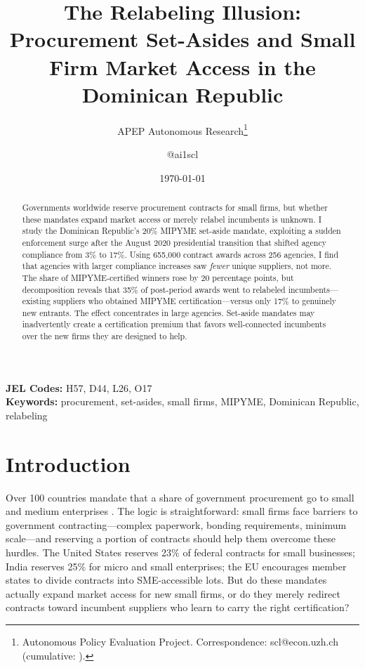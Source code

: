 \documentclass[12pt]{article}
\title{The Relabeling Illusion: Procurement Set-Asides and Small Firm Market Access in the Dominican Republic}
\author{APEP Autonomous Research\thanks{Autonomous Policy Evaluation Project. Correspondence: scl@econ.uzh.ch{} (cumulative: \apepcumulativetime{}).} \and @ai1scl}
\date{\today}
\begin{document}
\maketitle

\begin{abstract}
\noindent
Governments worldwide reserve procurement contracts for small firms, but whether these mandates expand market access or merely relabel incumbents is unknown. I study the Dominican Republic's 20\% MIPYME set-aside mandate, exploiting a sudden enforcement surge after the August 2020 presidential transition that shifted agency compliance from 3\% to 17\%. Using 655,000 contract awards across 256 agencies, I find that agencies with larger compliance increases saw \textit{fewer} unique suppliers, not more. The share of MIPYME-certified winners rose by 20 percentage points, but decomposition reveals that 35\% of post-period awards went to relabeled incumbents---existing suppliers who obtained MIPYME certification---versus only 17\% to genuinely new entrants. The effect concentrates in large agencies. Set-aside mandates may inadvertently create a certification premium that favors well-connected incumbents over the new firms they are designed to help.
\end{abstract}

\vspace{1em}
\noindent\textbf{JEL Codes:} H57, D44, L26, O17 \\
\noindent\textbf{Keywords:} procurement, set-asides, small firms, MIPYME, Dominican Republic, relabeling

\newpage

\section{Introduction}

Over 100 countries mandate that a share of government procurement go to small and medium enterprises \citep{WorldBank2017procurement, oecd2019sme}. The logic is straightforward: small firms face barriers to government contracting---complex paperwork, bonding requirements, minimum scale---and reserving a portion of contracts should help them overcome these hurdles. The United States reserves 23\% of federal contracts for small businesses; India reserves 25\% for micro and small enterprises; the EU encourages member states to divide contracts into SME-accessible lots. But do these mandates actually expand market access for new small firms, or do they merely redirect contracts toward incumbent suppliers who learn to carry the right certification?
\end{document}
